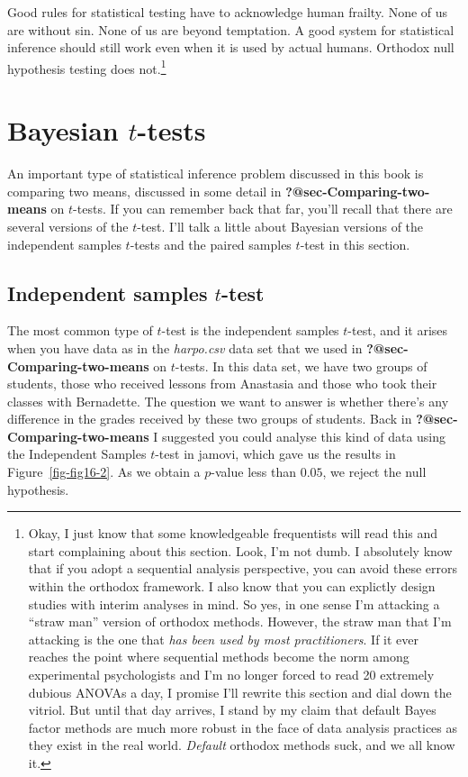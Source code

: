 \documentclass[
  a4paper,
]{book}
\begin{document}
Good rules for statistical testing have to acknowledge human frailty.
None of us are without sin. None of us are beyond temptation. A good
system for statistical inference should still work even when it is used
by actual humans. Orthodox null hypothesis testing does not.\footnote{Okay,
  I just know that some knowledgeable frequentists will read this and
  start complaining about this section. Look, I'm not dumb. I absolutely
  know that if you adopt a sequential analysis perspective, you can
  avoid these errors within the orthodox framework. I also know that you
  can explictly design studies with interim analyses in mind. So yes, in
  one sense I'm attacking a ``straw man'' version of orthodox methods.
  However, the straw man that I'm attacking is the one that \emph{has
  been used by most practitioners}. If it ever reaches the point where
  sequential methods become the norm among experimental psychologists
  and I'm no longer forced to read 20 extremely dubious ANOVAs a day, I
  promise I'll rewrite this section and dial down the vitriol. But until
  that day arrives, I stand by my claim that default Bayes factor
  methods are much more robust in the face of data analysis practices as
  they exist in the real world. \emph{Default} orthodox methods suck,
  and we all know it.}

\hypertarget{bayesian-t-tests}{%
\section{\texorpdfstring{Bayesian
\(t\)-tests}{Bayesian t-tests}}\label{bayesian-t-tests}}

An important type of statistical inference problem discussed in this
book is comparing two means, discussed in some detail in
\textbf{?@sec-Comparing-two-means} on \(t\)-tests. If you can remember
back that far, you'll recall that there are several versions of the
\(t\)-test. I'll talk a little about Bayesian versions of the
independent samples \(t\)-tests and the paired samples \(t\)-test in
this section.

\hypertarget{independent-samples-t-test}{%
\subsection{\texorpdfstring{Independent samples
\(t\)-test}{Independent samples t-test}}\label{independent-samples-t-test}}

The most common type of \(t\)-test is the independent samples
\(t\)-test, and it arises when you have data as in the \emph{harpo.csv}
data set that we used in \textbf{?@sec-Comparing-two-means} on
\(t\)-tests. In this data set, we have two groups of students, those who
received lessons from Anastasia and those who took their classes with
Bernadette. The question we want to answer is whether there's any
difference in the grades received by these two groups of students. Back
in \textbf{?@sec-Comparing-two-means} I suggested you could analyse this
kind of data using the Independent Samples \(t\)-test in jamovi, which
gave us the results in Figure~\ref{fig-fig16-2}. As we obtain a
\(p\)-value less than \(0.05\), we reject the null hypothesis.
\end{document}
